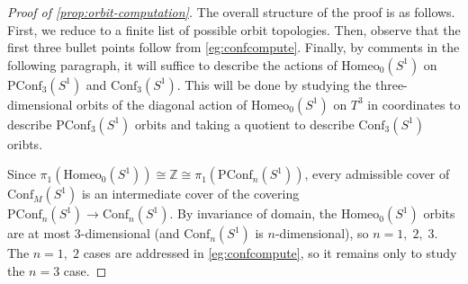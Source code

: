 \documentclass[10pt, oneside]{article}
\newcommand{\Z}{\mathbb{Z}}
\newcommand{\homeo}[1][S^1]{\text{Homeo}_0(#1)}
\newcommand{\conf}[2][S^1]{\text{Conf}_{#2}(#1)}
\newcommand{\pconf}[2][S^1]{\text{PConf}_{#2}(#1)}
\theoremstyle{definition}
\theoremstyle{definition}
\begin{document}
\begin{proof}[Proof of \cref{prop:orbit-computation}]
    The overall structure of the proof is as follows. First, we reduce to a finite list of possible orbit topologies. Then, observe that the first three bullet points follow from \cref{eg:confcompute}. Finally, by comments in the following paragraph, it will suffice to describe the actions of $\homeo$ on $\pconf{3}$ and $\conf{3}$. This will be done by studying the three-dimensional orbits of the diagonal action of $\homeo$ on $T^3$ in coordinates to describe $\pconf{3}$ orbits and taking a quotient to describe $\conf{3}$ oribts.

    Since $\pi_1(\homeo) \cong \Z \cong \pi_1(\pconf[S^1]{n})$, every admissible cover of $\conf[S^1]{M}$ is an intermediate cover of the covering $\pconf[S^1]{n}\to \conf[S^1]{n}$. By invariance of domain, the $\homeo$ orbits are at most 3-dimensional (and $\conf[S^1]{n}$ is $n$-dimensional), so $n=1,\; 2,\; 3$. The $n=1,\; 2$ cases are addressed in \cref{eg:confcompute}, so it remains only to study the $n=3$ case. 


\end{proof}
\end{document}
